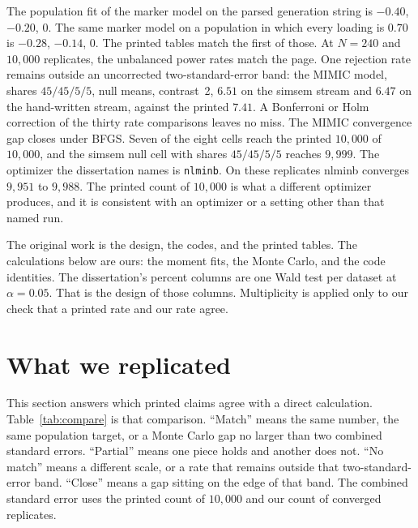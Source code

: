 \documentclass[11pt]{article}
\begin{document}
The population fit of the marker model on the parsed generation string
is \(-0.40\), \(-0.20\), \(0\). The same marker model on a population
in which every loading is \(0.70\) is \(-0.28\), \(-0.14\), \(0\).
The printed tables match the first of those. At \(N=240\) and
\(10{,}000\) replicates, the unbalanced power rates match the page.
One rejection rate remains outside an uncorrected two-standard-error
band: the MIMIC model, shares \(45/45/5/5\), null means, contrast~2,
\(6.51\) on the simsem stream and \(6.47\) on the hand-written stream,
against the printed \(7.41\). A Bonferroni or Holm correction of the
thirty rate comparisons leaves no miss.
The MIMIC convergence gap closes under BFGS. Seven of the eight cells
reach the printed \(10{,}000\) of \(10{,}000\), and the simsem null cell
with shares \(45/45/5/5\) reaches \(9{,}999\). The optimizer the
dissertation names is \texttt{nlminb}. On these replicates nlminb
converges \(9{,}951\) to \(9{,}988\). The printed count of \(10{,}000\)
is what a different optimizer produces, and it is consistent with an
optimizer or a setting other than that named run.

The original work is the design, the codes, and the printed tables.
The calculations below are ours: the moment fits, the Monte Carlo, and
the code identities. The dissertation's percent columns are one Wald
test per dataset at \(\alpha=0.05\). That is the design of those
columns. Multiplicity is applied only to our check that a printed rate
and our rate agree.

\section{What we replicated}
\label{sec:replicated}

This section answers which printed claims agree with a direct
calculation. Table~\ref{tab:compare} is that comparison.
``Match'' means the same number, the same population target, or a Monte
Carlo gap no larger than two combined standard errors.
``Partial'' means one piece holds and another does not.
``No match'' means a different scale, or a rate that remains outside
that two-standard-error band.
``Close'' means a gap sitting on the edge of that band.
The combined standard error uses the printed count of \(10{,}000\) and
our count of converged replicates.
\end{document}
